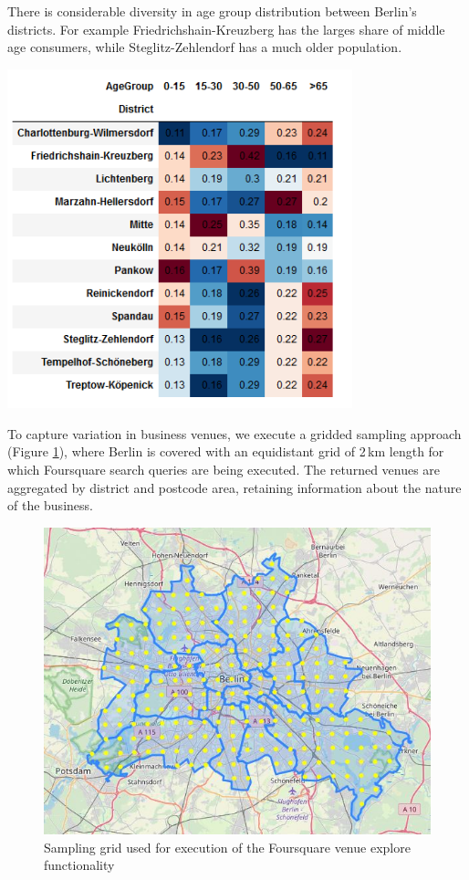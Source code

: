 \documentclass[letter]{scrartcl}
\begin{document}
\begin{table}[h]
\centering
\caption{There is considerable diversity in age group distribution between Berlin's districts. For example Friedrichshain-Kreuzberg has the larges share of middle age consumers, while Steglitz-Zehlendorf has a much older population.}
\includegraphics[width=10cm]{./BerlinTable_color.PNG}
\label{tab:demo}
\end{table}

To capture variation in business venues, we execute a gridded sampling approach (Figure \ref{fig:Grid}), where Berlin is covered with an equidistant grid of 2\,km length for which Foursquare search queries are being executed. The returned venues are aggregated by district and postcode area, retaining information about the nature of the business.   

\begin{figure}[h!]
\centering
\includegraphics[width=12cm]{./Grid.JPG}
\caption{Sampling grid used for execution of the Foursquare venue explore functionality}\label{fig:Grid}
\end{figure}
\end{document}
